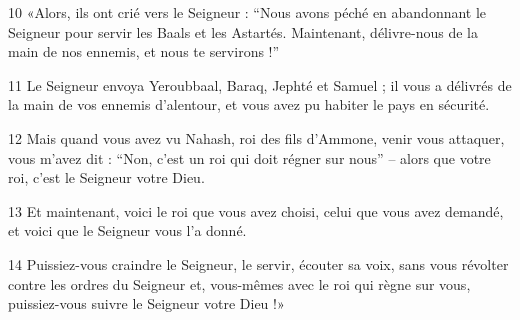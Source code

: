 
10 «Alors, ils ont crié vers le Seigneur : “Nous avons péché en abandonnant le Seigneur pour servir les Baals et les Astartés. Maintenant, délivre-nous de la main de nos ennemis, et nous te servirons !”

11 Le Seigneur envoya Yeroubbaal, Baraq, Jephté et Samuel ; il vous a délivrés de la main de vos ennemis d’alentour, et vous avez pu habiter le pays en sécurité.

12 Mais quand vous avez vu Nahash, roi des fils d’Ammone, venir vous attaquer, vous m’avez dit : “Non, c’est un roi qui doit régner sur nous” – alors que votre roi, c’est le Seigneur votre Dieu.

13 Et maintenant, voici le roi que vous avez choisi, celui que vous avez demandé, et voici que le Seigneur vous l’a donné.

14 Puissiez-vous craindre le Seigneur, le servir, écouter sa voix, sans vous révolter contre les ordres du Seigneur et, vous-mêmes avec le roi qui règne sur vous, puissiez-vous suivre le Seigneur votre Dieu !»